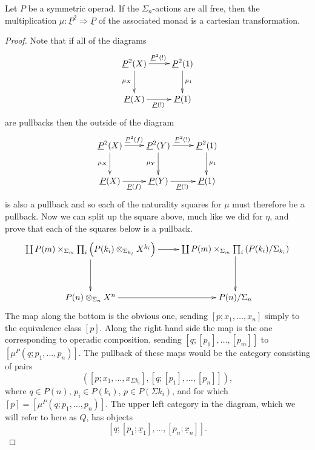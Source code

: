 \begin{prop}
Let $P$ be a symmetric operad. If the $\Sigma_n$-actions are all free, then the multiplication $\mu \colon  \underline{P}^{2} \Rightarrow \underline{P}$ of the associated monad is a cartesian transformation.
\end{prop}
\begin{proof}
Note that if all of the diagrams
    \[
        \xy
            (0,0)*+{\underline{P}^2(X)}="00";
            (20,0)*+{\underline{P}^2(1)}="10";
            (0,-15)*+{\underline{P}(X)}="01";
            (20,-15)*+{\underline{P}(1)}="11";
            {\ar^{\underline{P}^2(!)} "00" ; "10"};
            {\ar^{\mu_1} "10" ; "11"};
            {\ar_{\mu_X} "00" ; "01"};
            {\ar_{\underline{P}(!)} "01" ; "11"};
        \endxy
    \]
are pullbacks then the outside of the diagram
    \[
        \xy
            (0,0)*+{\underline{P}^2(X)}="00";
            (20,0)*+{\underline{P}^2(Y)}="10";
            (40,0)*+{\underline{P}^2(1)}="20";
            (0,-15)*+{\underline{P}(X)}="01";
            (20,-15)*+{\underline{P}(Y)}="11";
            (40,-15)*+{\underline{P}(1)}="21";
            {\ar^{\underline{P}^2(f)} "00" ; "10"};
            {\ar^{\underline{P}^2(!)} "10" ; "20"};
            {\ar^{\mu_{1}} "20" ; "21"};
            {\ar_{\mu_X} "00" ; "01"};
            {\ar_{\underline{P}(f)} "01" ; "11"};
            {\ar_{\underline{P}(!)} "11" ; "21"};
            {\ar_{\mu_Y} "10" ; "11"};
        \endxy
    \]
is also a pullback and so each of the naturality squares for $\mu$ must therefore be a pullback. Now we can split up the square above, much like we did for $\eta$, and prove that each of the squares below is a pullback.
    \[
        \xy
            (0,0)*+{\coprod P(m) \times_{\Sigma_m} \prod_i \left(\coeqsig{P}{X}{{k_i}}\right)}="00";
            (60,0)*+{\coprod P(m) \times_{\Sigma_m} \prod_i \left(P(k_i) / \Sigma_{k_i}\right)}="10";
            (0,-20)*+{\coeqsig{P}{X}{n}}="01";
            (60,-20)*+{P(n) / \Sigma_{n}}="11";
            {\ar "00" ; "10"};
            {\ar "00" ; "01"};
            {\ar "01" ; "11"};
            {\ar "10" ; "11"};
        \endxy
    \]
The map along the bottom is the obvious one, sending $[p; x_1, \ldots, x_n]$ simply to the equivalence class $[p]$. Along the right hand side the map is the one corresponding to operadic composition, sending $[q;[p_1],\ldots,[p_m]]$ to $[\mu^P(q;p_1,\ldots,p_n)]$. The pullback of these maps would be the category consisting of pairs
    \[
        \left([p;x_1,\ldots,x_{\Sigma k_i}],[q;[p_1],\ldots,[p_n]]\right),
    \]
where $q \in P(n)$, $p_i \in P(k_i)$, $p \in P(\Sigma k_i)$, and for which $[p] = [\mu^P(q;p_1,\ldots,p_n)]$. The upper left category in the diagram, which we will refer to here as $Q$, has objects
    \[
        \left[q;\left[p_1;\underline{x}_1\right],\ldots,\left[p_n;\underline{x}_n\right]\right].
    \]


\end{proof}
